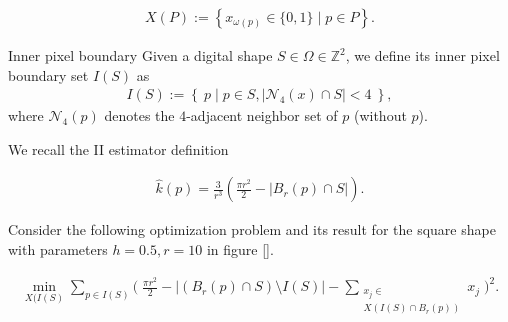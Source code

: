 \begin{align*}
	X(P) := \left\{ x_{\omega(p)} \in \{0,1\} \; | \; p \in P \right\}.
\end{align*}

\begin{definition}{Inner pixel boundary}
Given a digital shape $S \in \Omega \in \mathbb{Z}^2$, we define its inner pixel boundary set $I(S)$ as
\begin{align*}
	I(S) := \left\{ \: p \; | \; p \in S, |\mathcal{N}_4(x) \cap S|<4 \: \right\},
\end{align*}
where $\mathcal{N}_4(p)$ denotes the $4$-adjacent neighbor set of $p$ (without $p$).
\end{definition}


We recall the II estimator definition

\begin{align*}
	\hat{k}(p) = \frac{3}{r^3}\left( \frac{\pi r^2}{2} - |B_r(p) \cap S| \right).
\end{align*}

Consider the following optimization problem and its result for the square shape with parameters $h=0.5,r=10$ in figure \ref{}.

\begin{align}
	\min_{X(I(S)} \sum_{p \in I(S)}{ \Big( \; \frac{\pi r^2}{2} - | (B_r(p) \cap S) \setminus I(S) | - \sum_{ \substack{x_j \in \\ X( I(S) \cap B_r(p))}}{x_j} \; \Big)^2}.
	\label{eq:naive-opt-problem}
\end{align}

